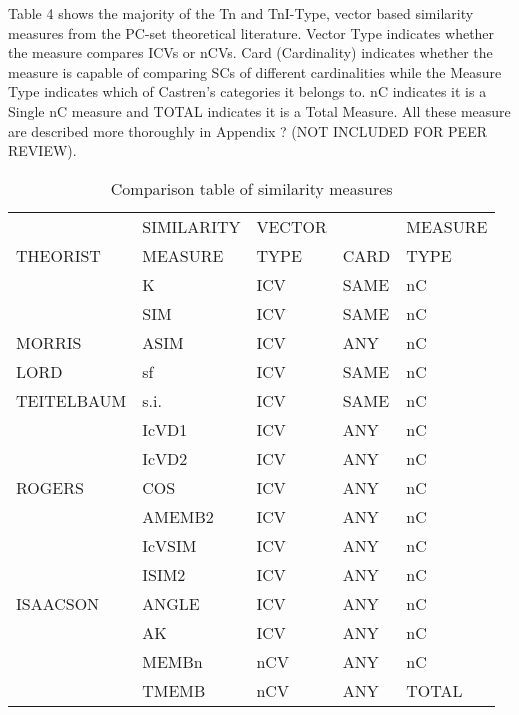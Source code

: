\documentclass{article}
\begin{document}
Table 4 shows the majority of the Tn and TnI-Type, vector based
similarity measures from the PC-set theoretical literature. Vector
Type indicates whether the measure compares ICVs or nCVs. Card
(Cardinality) indicates whether the measure is capable of comparing
SCs of different cardinalities while the Measure Type indicates which
of Castren's categories it belongs to. nC indicates it is a Single nC
measure and TOTAL indicates it is a Total Measure. All these measure
are described more thoroughly in Appendix ? (NOT INCLUDED FOR PEER
REVIEW).

\begin{table}[htb]
\caption{Comparison table of similarity measures} 
\begin{center}
\begin{tabular}{lllll}
\hline
             &  SIMILARITY  &  VECTOR  &        &  MEASURE  \\
 THEORIST    &  MEASURE     &  TYPE    &  CARD  &  TYPE     \\
\hline
             &  K           &  ICV     &  SAME  &  nC       \\
             &  SIM         &  ICV     &  SAME  &  nC       \\
 MORRIS      &  ASIM        &  ICV     &  ANY   &  nC       \\
\hline
 LORD        &  sf          &  ICV     &  SAME  &  nC       \\
\hline
 TEITELBAUM  &  s.i.        &  ICV     &  SAME  &  nC       \\
\hline
             &  IcVD1       &  ICV     &  ANY   &  nC       \\
             &  IcVD2       &  ICV     &  ANY   &  nC       \\
 ROGERS      &  COS         &  ICV     &  ANY   &  nC       \\
\hline
             &  AMEMB2      &  ICV     &  ANY   &  nC       \\
             &  IcVSIM      &  ICV     &  ANY   &  nC       \\
             &  ISIM2       &  ICV     &  ANY   &  nC       \\
 ISAACSON    &  ANGLE       &  ICV     &  ANY   &  nC       \\
\hline
             &  AK          &  ICV     &  ANY   &  nC       \\
             &  MEMBn       &  nCV     &  ANY   &  nC       \\
             &  TMEMB       &  nCV     &  ANY   &  TOTAL    \\

\end{tabular}
\end{center}
\end{table}
\end{document}

